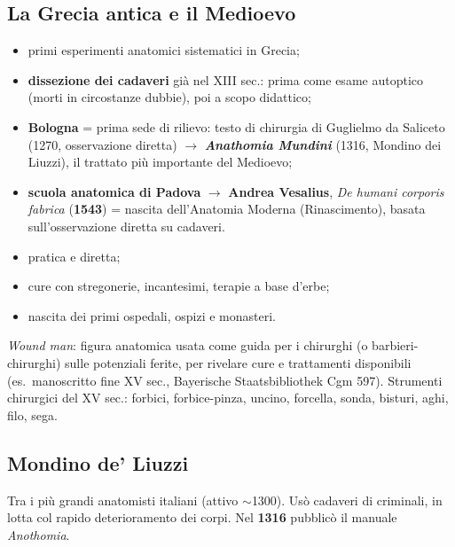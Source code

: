 \subsection{La Grecia antica e il Medioevo}
\begin{itemize}
  \item primi esperimenti anatomici sistematici in Grecia;
  \item \textbf{dissezione dei cadaveri} già nel XIII sec.: prima come esame autoptico (morti in
    circostanze dubbie), poi a scopo didattico;
  \item \textbf{Bologna} = prima sede di rilievo: testo di chirurgia di Guglielmo da Saliceto
    (1270, osservazione diretta) $\rightarrow$ \textbf{\textit{Anathomia Mundini}} (1316, Mondino
    dei Liuzzi), il trattato più importante del Medioevo;
  \item \textbf{scuola anatomica di Padova} $\rightarrow$ \textbf{Andrea Vesalius},
    \textit{De humani corporis fabrica} (\textbf{1543}) = nascita dell'Anatomia Moderna
    (Rinascimento), basata sull'osservazione diretta su cadaveri.
\end{itemize}

\begin{itemize}
  \item pratica e diretta;
  \item cure con stregonerie, incantesimi, terapie a base d'erbe;
  \item nascita dei primi ospedali, ospizi e monasteri.
\end{itemize}
\textit{Wound man}: figura anatomica usata come guida per i chirurghi (o barbieri-chirurghi) sulle
potenziali ferite, per rivelare cure e trattamenti disponibili (es.\ manoscritto fine XV sec.,
Bayerische Staatsbibliothek Cgm 597). Strumenti chirurgici del XV sec.: forbici, forbice-pinza,
uncino, forcella, sonda, bisturi, aghi, filo, sega.

\subsection{Mondino de' Liuzzi}
Tra i più grandi anatomisti italiani (attivo $\sim$1300). Usò cadaveri di criminali, in lotta col
rapido deterioramento dei corpi. Nel \textbf{1316} pubblicò il manuale \textit{Anothomia}.

